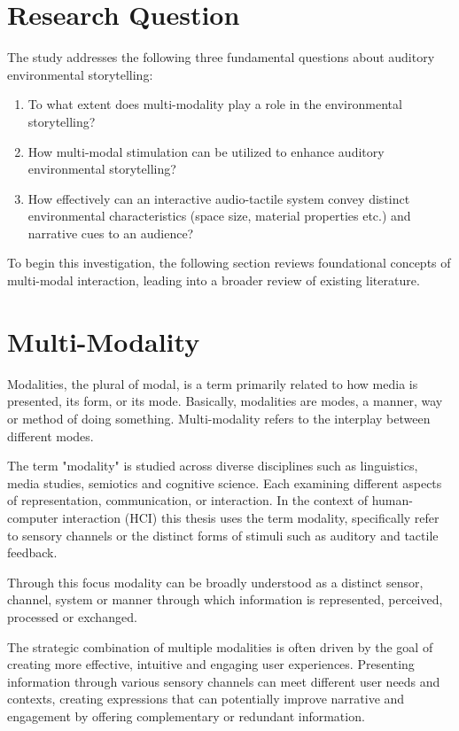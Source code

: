     \section{Research Question} 
    The study addresses the following three fundamental questions about auditory environmental storytelling:
    \begin{enumerate}
        \item To what extent does multi-modality play a role in the environmental storytelling?
        \item How multi-modal stimulation can be utilized to enhance auditory environmental storytelling?
        \item How effectively can an interactive audio-tactile system convey distinct environmental characteristics (space size, material properties etc.) and narrative cues to an audience?
    \end{enumerate}
    To begin this investigation, the following section reviews foundational concepts of multi-modal interaction, leading into a broader review of existing literature.
    \section{Multi-Modality} 
    Modalities, the plural of modal, is a term primarily related to how media is presented, its form, or its mode. Basically, modalities are modes, a manner, way or method of doing something. Multi-modality refers to the interplay between different modes\cite{Multimodal_Discourse}.\par 

    The term "modality" is studied across diverse disciplines such as linguistics, media studies, semiotics and cognitive science. Each examining different aspects of representation, communication, or interaction. In the context of human-computer interaction (HCI) this thesis uses the term modality, specifically refer to sensory channels or the distinct forms of stimuli such as auditory and tactile feedback.\par

    Through this focus modality can be broadly understood as a distinct sensor, channel, system or manner through which information is represented, perceived, processed or exchanged.\par

    The strategic combination of multiple modalities is often driven by the goal of creating more effective, intuitive and engaging user experiences. Presenting information through various sensory channels can meet different user needs and contexts, creating expressions that can potentially improve narrative and engagement by offering complementary or redundant information.\par

